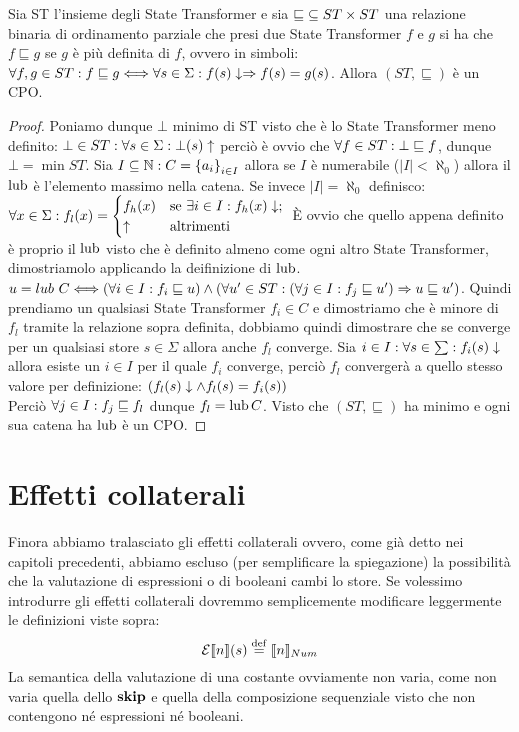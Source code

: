 \begin{proposizione} 
Sia ST l'insieme degli State Transformer e sia $\mathord{\sqsubseteq}\subseteq ST\times ST$ una relazione binaria di ordinamento parziale che presi due State Transformer $f$ e $g$ si ha che $f \sqsubseteq g$ se $g$ è più definita di $f$, ovvero in simboli: $\forall f,g \in ST \mathrel{:} f \sqsubseteq g \Longleftrightarrow \forall s \in \Sigma \mathrel{:} f(s)\downarrow \Rightarrow f(s) = g(s)$. Allora $(ST, \sqsubseteq)$ è un CPO.
\end{proposizione}
\begin{proof}
Poniamo dunque $\bot$ minimo di ST visto che è lo State Transformer meno definito: $\bot \in ST \mathrel{:} \forall s \in \Sigma \mathrel{:} \bot(s)\uparrow$ perciò è ovvio che $\forall f \in ST \mathrel{:} \bot \sqsubseteq f$, dunque $\bot = \min ST$. 
Sia $I \subseteq \mathbb{N} \mathrel{:} C = \left\{a_i\right\}_{i \in I}$ allora se $I$ è numerabile ($|I| < \aleph_0$) allora il $\mathop{\mathrm{lub}}\nolimits$ è l'elemento massimo nella catena. Se invece $|I| = \aleph_0$ definisco:
	$\forall x \in \Sigma \mathrel{:} f_l(x) =
    \begin{cases}
      f_h(x) & \text{se } \exists i \in I : f_h(x)\downarrow;\\
      \uparrow & \text{altrimenti}
    \end{cases}\\ $
È ovvio che quello appena definito è proprio il $\mathop{\mathrm{lub}}\nolimits$ visto che è definito almeno come ogni altro State Transformer, dimostriamolo applicando la deifinizione di $\mathop{\mathrm{lub}}\nolimits$.
$u = lub\ C \Longleftrightarrow (\forall i \in I \mathrel{:} f_i \sqsubseteq u) \land (\forall u' \in ST \mathrel{:} (\forall j \in I \mathrel{:} f_j \sqsubseteq u') \Rightarrow u \sqsubseteq u')$.
Quindi prendiamo un qualsiasi State Transformer $f_i \in C$ e dimostriamo che è minore di $f_l$ tramite la relazione sopra definita, dobbiamo quindi dimostrare che se converge per un qualsiasi store $s \in \Sigma$ allora anche $f_l$ converge. Sia $i \in I \mathrel{:} \forall s \in \sum \mathrel{:} f_i(s)\downarrow$ allora esiste un $i \in I$ per il quale $f_i$ converge, perciò $f_l$ convergerà a quello stesso valore per definizione: $(f_l(s)\downarrow \land f_l(s)=f_i(s))$\\
Perciò $\forall j \in I \mathrel{:} f_j \sqsubseteq f_l$ dunque  $f_l = \mathop{\mathrm{lub}}\nolimits C$. Visto che $(ST, \sqsubseteq)$ ha minimo e ogni sua catena ha $\mathop{\mathrm{lub}}\nolimits$ è un CPO.
\end{proof}

\section{Effetti collaterali} 
Finora abbiamo tralasciato gli effetti collaterali ovvero, come già detto nei capitoli precedenti, abbiamo escluso (per semplificare la spiegazione) la possibilità che la valutazione di espressioni o di booleani cambi lo store. Se volessimo introdurre gli effetti collaterali dovremmo semplicemente modificare leggermente le definizioni viste sopra:
$$ \denot{\calE}{n}{s} \defeq \llbracket n \rrbracket_{Num}$$
La semantica della valutazione di una costante ovviamente non varia, come non varia quella dello $\mathop{\textup{\textbf{skip}}}$ e quella della composizione sequenziale visto che non contengono né espressioni né booleani.

